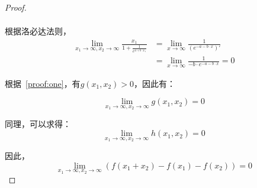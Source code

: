 \begin{proof}
\[\begin{aligned}
\end{aligned}
\]

根据洛必达法则，
\[
\begin{aligned}
\lim_{x_1 \to \infty,x_2\to \infty}\frac{x_1}{1+\frac{1}{e^{a+b\cdot x_1}}}&=\lim_{x \to \infty}\frac{1}{(e^{-a-b\cdot x})'}\\
&=\lim_{x \to \infty}\frac{1}{-b\cdot e^{-a-b\cdot x}}=0

\end{aligned}
\]

根据~\ref{proof:one}，有$g(x_1,x_2)>0$，因此有：

\[
\lim_{x_1 \to \infty,x_2\to \infty}g(x_1,x_2)=0
\]

同理，可以求得：
\[
\lim_{x_1 \to \infty,x_2\to \infty}h(x_1,x_2)=0
\]

因此，
\[
\lim_{x_1 \to \infty,x_2\to \infty}(f(x_1+x_2)-f(x_1)-f(x_2))=0
\]


\end{proof}